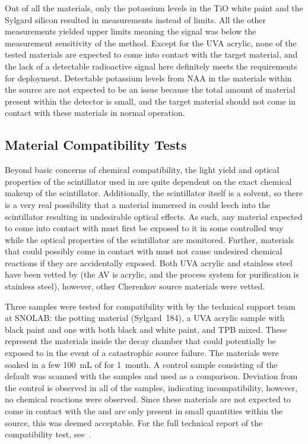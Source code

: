Out of all the materials, only the potassium levels in the TiO white paint and the Sylgard silicon resulted in measurements instead of limits. 
All the other measurements yielded upper limits meaning the signal was below the measurement sensitivity of the method. 
Except for the UVA acrylic, none of the tested materials are expected to come into contact with the target material, and the lack of a detectable radioactive signal here definitely meets the requirements for deployment.
Detectable potassium levels from NAA in the materials within the source are not expected to be an issue because the total amount of material present within the detector is small, and the target material should not come in contact with these materials in normal operation.

\subsection{Material Compatibility Tests}
\label{sec:comptest}
Beyond basic concerns of chemical compatibility, the light yield and optical properties of the {\labppo} scintillator used in {\snop} are quite dependent on the exact chemical makeup of the scintillator.
Additionally, the scintillator itself is a solvent, so there is a very real possibility that a material immersed in {\labppo} could leech into the scintillator resulting in undesirable optical effects.
As such, any material expected to come into contact with {\labppo} must first be exposed to it in some controlled way while the optical properties of the scintillator are monitored.
Further, materials that could possibly come in contact with {\labppo} must not cause undesired chemical reactions if they are accidentally exposed.
Both UVA acrylic and stainless steel have been vetted by {\snop} (the AV is acrylic, and the process system for {\labppo} purification is stainless steel), however, other Cherenkov source materials were vetted.

Three samples were tested for compatibility with {\labppo} by the technical support team at SNOLAB: the potting material (Sylgard~184), a UVA acrylic sample with black paint and one with both black and white paint, and TPB mixed. 
These represent the materials inside the decay chamber that could potentially be exposed to {\labppo} in the event of a catastrophic source failure.
The materials were soaked in a few 100~mL of {\labppo} for 1~month. 
A control sample consisting of the default {\labppo} was scanned with the samples and used as a comparison. 
Deviation from the control is observed in all of the samples, indicating incompatibility, however, no chemical reactions were observed.
Since these materials are not expected to come in contact with the {\labppo} and are only present in small quantities within the source, this was deemed acceptable.
For the full technical report of the compatibility test, see~\cite{lina:2015}.


